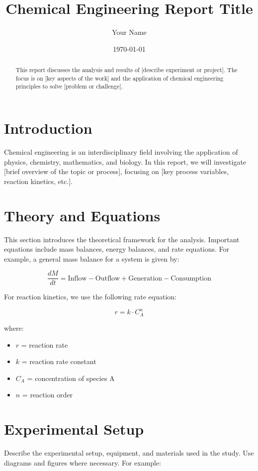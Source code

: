 \documentclass[a4paper, 12pt]{article}
\title{Chemical Engineering Report Title}
\author{Your Name}
\date{\today}
\begin{document}
\maketitle

\begin{abstract}
This report discusses the analysis and results of [describe experiment or project]. The focus is on [key aspects of the work] and the application of chemical engineering principles to solve [problem or challenge].
\end{abstract}

\section{Introduction}
Chemical engineering is an interdisciplinary field involving the application of physics, chemistry, mathematics, and biology. In this report, we will investigate [brief overview of the topic or process], focusing on [key process variables, reaction kinetics, etc.].

\lipsum[1-2]  %

\section{Theory and Equations}
This section introduces the theoretical framework for the analysis. Important equations include mass balances, energy balances, and rate equations. For example, a general mass balance for a system is given by:

\[
\frac{dM}{dt} = \text{Inflow} - \text{Outflow} + \text{Generation} - \text{Consumption}
\]

For reaction kinetics, we use the following rate equation:

\[
r = k \cdot C_A^n
\]

where:
\begin{itemize}
    \item $r$ = reaction rate
    \item $k$ = reaction rate constant
    \item $C_A$ = concentration of species A
    \item $n$ = reaction order
\end{itemize}

\lipsum[3]  %

\section{Experimental Setup}
Describe the experimental setup, equipment, and materials used in the study. Use diagrams and figures where necessary. For example:
\end{document}
